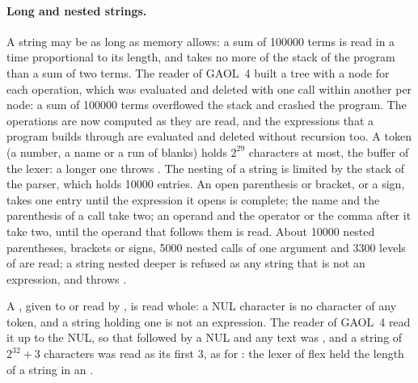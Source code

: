 \documentclass[12pt,a4paper,twoside,openright]{book}
\begin{document}
\paragraph{Long and nested strings.} A string may be as long as memory
allows: a sum of 100000 terms is read in a time proportional to its length,
and takes no more of the stack of the program than a sum of two
terms.\newinvfive{} The reader of GAOL~4 built a tree with a node for each
operation, which was evaluated and deleted with one call within another per
node: a sum of 100000 terms overflowed the stack and crashed the program.
The operations are now computed as they are read, and the expressions that
a program builds through  are
evaluated and deleted without recursion too. A token (a number, a name or a
run of blanks) holds $2^{29}$ characters at most, the buffer of the lexer: a
longer one throws . The nesting of a string is limited
by the stack of the parser, which holds 10000 entries. An open parenthesis
or bracket, or a sign, takes one entry until the expression it opens is
complete; the name and the parenthesis of a call take two; an operand and
the operator or the comma after it take two, until the operand that follows
them is read. About 10000 nested parentheses, brackets or signs, 5000 nested
calls of one argument and 3300 levels of  are read; a
string nested deeper is refused as any string that is not an expression,
and throws .

A , given to  or read by
, is read whole: a NUL character is no character of any
token, and a string holding one is not an expression.\newinvfive{} The
reader of GAOL~4 read it up to the NUL, so that  followed by
a NUL and any text was , and a string of $2^{32}+3$ characters
was read as its first 3, as  for : the
lexer of flex held the length of a string in an .
\end{document}
